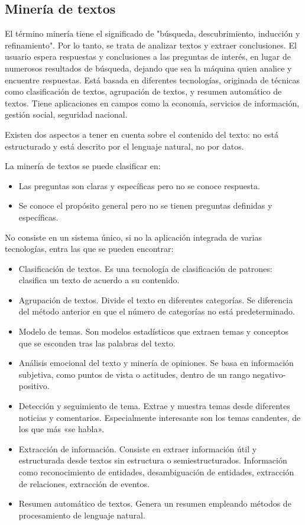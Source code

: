 \documentclass[../main.tex]{subfiles}
\begin{document}
\subsection{Minería de textos}

El término minería tiene el significado de "búsqueda, descubrimiento, inducción y refinamiento". Por lo tanto, se trata de analizar textos y extraer conclusiones. El usuario espera respuestas y conclusiones a las preguntas de interés, en lugar de numerosos resultados de búsqueda, dejando que sea la máquina quien analice y encuentre respuestas. Está basada en diferentes tecnologías, originada de técnicas como clasificación de textos, agrupación de textos, y resumen automático de textos. Tiene aplicaciones en campos como la economía, servicios de información, gestión social, seguridad nacional.

Existen dos aspectos a tener en cuenta sobre el contenido del texto: no está estructurado y está descrito por el lenguaje natural, no por datos. 

La minería de textos se puede clasificar en:

\begin{itemize}
	\item Las preguntas son claras y específicas pero no se conoce respuesta.
	\item Se conoce el propósito general pero no se tienen preguntas definidas y específicas.
\end{itemize}

No consiste en un sistema único, si no la aplicación integrada de varias tecnologías, entra las que se pueden encontrar:

\begin{itemize}
	\item Clasificación de textos. Es una tecnología de clasificación de patrones: clasifica un texto de acuerdo a su contenido.
	\item Agrupación de textos. Divide el texto en diferentes categorías. Se diferencia del método anterior en que el número de categorías no está predeterminado.
	\item Modelo de temas. Son modelos estadísticos que extraen temas y conceptos que se esconden tras las palabras del texto.
	\item Análisis emocional del texto y minería de opiniones. Se basa en información subjetiva, como puntos de vista o actitudes, dentro de un rango negativo-positivo.
	\item Detección y seguimiento de tema. Extrae y muestra temas desde diferentes noticias y comentarios. Especialmente interesante son los temas candentes, de los que más «se habla».
	\item Extracción de información. Consiste en extraer información útil y estructurada desde textos sin estructura o semiestructurados. Información como reconocimiento de entidades, desambiguación de entidades, extracción de relaciones, extracción de eventos.
	\item Resumen automático de textos. Genera un resumen empleando métodos de procesamiento de lenguaje natural.
\end{itemize}
\end{document}
